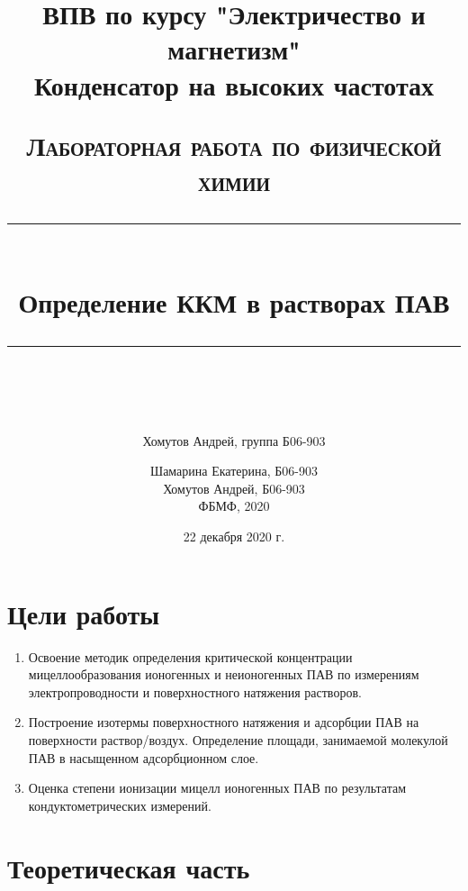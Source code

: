 \documentclass[a4paper, 12pt]{article}
\author{Хомутов Андрей, группа Б06-903}
\title{ВПВ по курсу "Электричество и магнетизм" \\ Конденсатор на высоких частотах}
\date{22 декабря 2020 г.}
\newcommand{\HRule}[1]{\rule{\linewidth}{#1}}
\begin{document}
\title{ \normalsize \textsc{Лабораторная работа по физической химии}
		\\ [4.0cm]
		\HRule{0.5pt} \\ [0.3cm]
		\LARGE \textbf{{Определение ККМ в растворах ПАВ}}
		\HRule{0.5pt} \\ [0.1cm]
		\normalsize  \vspace*{18\baselineskip}}

\date{}

\author{Шамарина Екатерина, Б06-903 \\
		Хомутов Андрей, Б06-903 \\
ФБМФ, 2020\\ }

\maketitle
\thispagestyle{empty}
\newpage
\section*{Цели работы} 
\begin{enumerate}
    \item Освоение методик определения критической концентрации мицеллообразования ионогенных и неионогенных ПАВ по измерениям электропроводности и поверхностного натяжения растворов.
    \item Построение изотермы поверхностного натяжения и адсорбции ПАВ на поверхности раствор/воздух. Определение площади, занимаемой молекулой ПАВ в насыщенном адсорбционном слое.
    \item Оценка степени ионизации мицелл ионогенных ПАВ по результатам кондуктометрических измерений.
\end{enumerate}
\section{Теоретическая часть}
\end{document}
